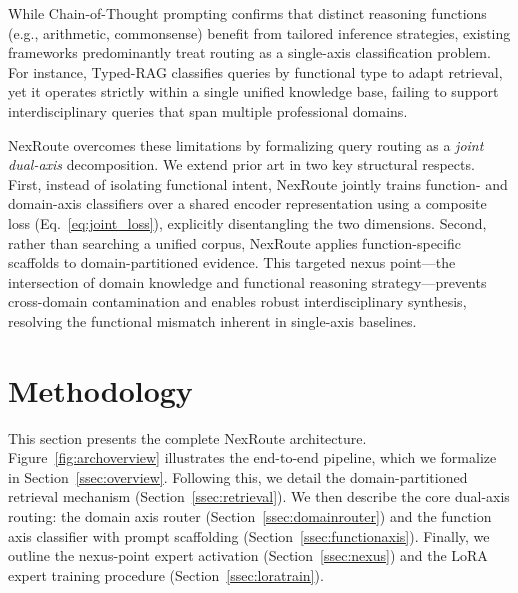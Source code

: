 \documentclass[a4paper,fleql]{cas-sc}
\begin{document}
While Chain-of-Thought prompting \citep{wei2022chain} confirms that distinct reasoning functions (e.g., arithmetic, commonsense) benefit from tailored inference strategies, existing frameworks predominantly treat routing as a single-axis classification problem. For instance, Typed-RAG \citep{typedrag} classifies queries by functional type to adapt retrieval, yet it operates strictly within a single unified knowledge base, failing to support interdisciplinary queries that span multiple professional domains.

NexRoute overcomes these limitations by formalizing query routing as a \emph{joint dual-axis} decomposition. We extend prior art in two key structural respects. First, instead of isolating functional intent, NexRoute jointly trains function- and domain-axis classifiers over a shared encoder representation using a composite loss (Eq.~\ref{eq:joint_loss}), explicitly disentangling the two dimensions. Second, rather than searching a unified corpus, NexRoute applies function-specific scaffolds to domain-partitioned evidence. This targeted nexus point—the intersection of domain knowledge and functional reasoning strategy—prevents cross-domain contamination and enables robust interdisciplinary synthesis, resolving the functional mismatch inherent in single-axis baselines.
\section{Methodology}
\label{sec:method}

This section presents the complete NexRoute architecture. Figure~\ref{fig:archoverview} illustrates the end-to-end pipeline, which we formalize in Section~\ref{ssec:overview}. Following this, we detail the domain-partitioned retrieval mechanism (Section~\ref{ssec:retrieval}). We then describe the core dual-axis routing: the domain axis router (Section~\ref{ssec:domainrouter}) and the function axis classifier with prompt scaffolding (Section~\ref{ssec:functionaxis}). Finally, we outline the nexus-point expert activation (Section~\ref{ssec:nexus}) and the LoRA expert training procedure (Section~\ref{ssec:loratrain}).

\end{document}
